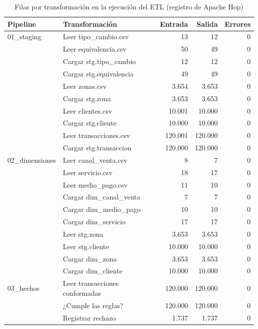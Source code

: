 \begin{table}[!htbp]
  \centering
  \caption{Filas por transformación en la ejecución del ETL (registro de Apache Hop)}
  \label{tab:est_hop}
  \small
  \begin{tabularx}{\linewidth}{@{}l>{\raggedright\arraybackslash}Xrrr@{}}
    \toprule
    \textbf{Pipeline} & \textbf{Transformación} & \textbf{Entrada} & \textbf{Salida} & \textbf{Errores} \\
    \midrule
    01\_staging & Leer tipo\_cambio.csv & 13 & 12 & 0 \\
     & Leer equivalencia.csv & 50 & 49 & 0 \\
     & Cargar stg.tipo\_cambio & 12 & 12 & 0 \\
     & Cargar stg.equivalencia & 49 & 49 & 0 \\
     & Leer zonas.csv & 3.654 & 3.653 & 0 \\
     & Cargar stg.zona & 3.653 & 3.653 & 0 \\
     & Leer clientes.csv & 10.001 & 10.000 & 0 \\
     & Cargar stg.cliente & 10.000 & 10.000 & 0 \\
     & Leer transacciones.csv & 120.001 & 120.000 & 0 \\
     & Cargar stg.transaccion & 120.000 & 120.000 & 0 \\
    \midrule
    02\_dimensiones & Leer canal\_venta.csv & 8 & 7 & 0 \\
     & Leer servicio.csv & 18 & 17 & 0 \\
     & Leer medio\_pago.csv & 11 & 10 & 0 \\
     & Cargar dim\_canal\_venta & 7 & 7 & 0 \\
     & Cargar dim\_medio\_pago & 10 & 10 & 0 \\
     & Cargar dim\_servicio & 17 & 17 & 0 \\
     & Leer stg.zona & 3.653 & 3.653 & 0 \\
     & Leer stg.cliente & 10.000 & 10.000 & 0 \\
     & Cargar dim\_zona & 3.653 & 3.653 & 0 \\
     & Cargar dim\_cliente & 10.000 & 10.000 & 0 \\
    \midrule
    03\_hechos & Leer transacciones conformadas & 120.000 & 120.000 & 0 \\
     & ¿Cumple las reglas? & 120.000 & 120.000 & 0 \\
     & Registrar rechazo & 1.737 & 1.737 & 0 \\

\end{tabularx}
\end{table}
